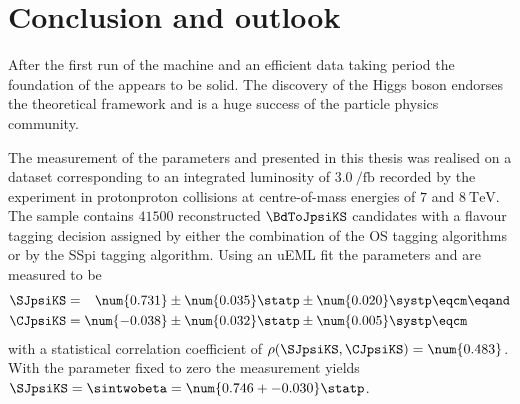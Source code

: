 
\chapter{Conclusion and outlook}
\label{ch:conclusion}

After the first run of the \LHC machine and an efficient data taking period the
foundation of the \SM appears to be solid. The discovery of the Higgs boson
\cite{Aad:2015zhl} endorses the theoretical framework and is a huge success of
the particle physics community. 


The measurement of the \CP parameters \SJpsiKS and \CJpsiKS presented in this
thesis was realised on a dataset corresponding to an integrated luminosity of
$\SI{3.0}{\per\femto\barn}$ recorded by the \LHCb experiment in
\acl{protonproton} collisions at centre-of-mass energies of $\num{7}$ and
$\SI{8}{\TeV}$. The sample contains $\num{41500}$ reconstructed $\BdToJpsiKS$
candidates with a flavour tagging decision assigned by either the combination of
the \acl{OS} tagging algorithms or by the \acl{SSpi} tagging algorithm. Using an
\acl{uEML} fit the \CP parameters \SJpsiKS and \CJpsiKS are measured to be
%
\begin{equation*}
  \begin{split}
    \SJpsiKS &= \phantom{-}\num{0.731} \pm \num{0.035} \statp \pm \num{0.020} \systp \eqcm\eqand \\
    \CJpsiKS &=           \num{-0.038} \pm \num{0.032} \statp \pm \num{0.005} \systp \eqcm
  \end{split}
\end{equation*}
%
with a statistical correlation coefficient of $\rho(\SJpsiKS,\CJpsiKS) =
\num{0.483}$. With the parameter \CJpsiKS fixed to zero the measurement yields
$\SJpsiKS = \sintwobeta = \num{0.746 +- 0.030}\statp$.

